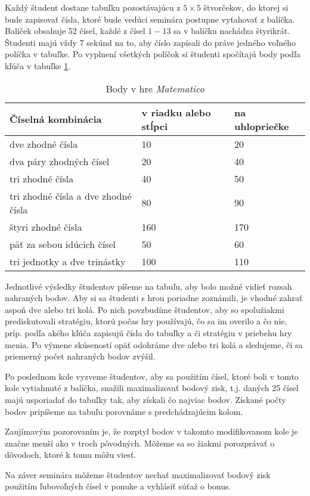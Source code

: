 Každý študent dostane tabuľku pozostávajúcu z $5\times5$ štvorčekov, do ktorej si bude zapisovať čísla, ktoré bude vedúci seminára postupne vyťahovať z balíčka. Balíček obsahuje 52 čísel, každé z čísel $1-13$ sa v balíčku nachádza štyrikrát. Študenti majú vždy 7 sekúnd na to, aby číslo zapísali do práve jedného voľného políčka v tabuľke. Po vyplnení všetkých políčok si študenti spočítajú body podľa kľúča v tabuľke \ref{fujky}.
\begin{table}
\begin{tabular}{l l l}
Číselná kombinácia & v riadku alebo stĺpci & na uhlopriečke \\
\hline
dve zhodné čísla & 10 & 20\\
dva páry zhodných čísel & 20 & 40\\
tri zhodné čísla & 40 & 50 \\
tri zhodné čísla a dve zhodné čísla & 80 & 90 \\
štyri zhodné čísla & 160 & 170 \\
päť za sebou idúcich čísel & 50 & 60 \\
tri jednotky a dve trinástky & 100 & 110 \\
\end{tabular}
\caption{Body v hre \textit{Matematico}} \label{fujky}
\end{table}

Jednotlivé výsledky študentov píšeme na tabuľu, aby bolo možné vidieť rozsah nahraných bodov. Aby si sa študenti s hrou poriadne zoznámili, je vhodné zahrať aspoň dve alebo tri kolá. Po nich povzbudíme študentov, aby so spolužiakmi prediskutovali stratégiu, ktorú počas hry používajú, čo sa im overilo a čo nie, príp. podľa akého kľúča zapisujú čísla do tabuľky a či stratégiu v priebehu hry menia. Po výmene skúseností opäť odohráme dve alebo tri kolá a sledujeme, či sa priemerný počet nahraných bodov zvýšil.

Po poslednom kole vyzveme študentov, aby sa použitím čísel, ktoré boli v tomto kole vytiahnuté z balíčka, snažili maximalizovať bodový zisk, t.j. daných 25 čísel majú usporiadať do tabuľky tak, aby získali čo najviac bodov. Získané počty bodov pripíšeme na tabuľu porovnáme s predchádzajúcim kolom.

Zaujímavým pozorovaním je, že rozptyl bodov v takomto modifikovanom kole je značne menší ako v troch pôvodných. Môžeme sa so žiakmi porozprávať o dôvodoch, ktoré k tomu môžu viesť.

Na záver seminára môžeme študentov nechať maximalizovať bodový zisk použitím ľubovoľných čísel v ponuke a vyhlásiť súťaž o bonus. \\

